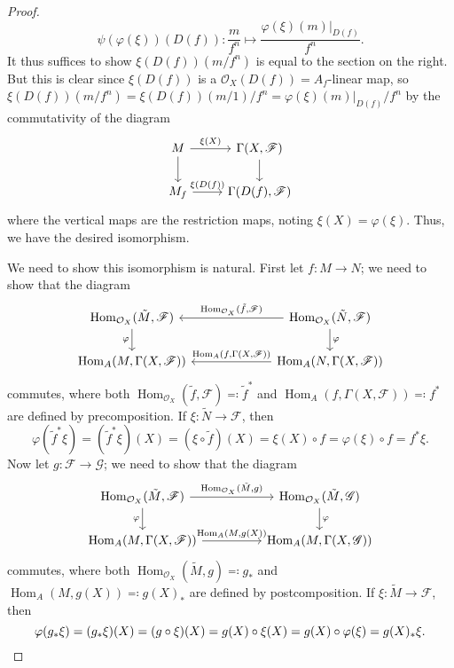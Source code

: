 \documentclass[12pt,letterpaper]{article}
\theoremstyle{definition}
\theoremstyle{remark}
\numberwithin{equation}{section}
\numberwithin{figure}{problem}
\DeclareMathOperator{\Hom}{Hom}
\newcommand{\FF}{\mathscr{F}}
\newcommand{\GG}{\mathscr{G}}
\newcommand{\OO}{\mathcal{O}}
\begin{document}
\begin{proof}
  \begin{equation*}
    \psi(\varphi(\xi))(D(f)) \colon \frac{m}{f^n} \mapsto \frac{\varphi(\xi)(m)\vert_{D(f)}}{f^n}.
  \end{equation*}
  It thus suffices to show $\xi(D(f))(m/f^n)$ is equal to the section on the right. But this is clear since $\xi(D(f))$ is a $\OO_X(D(f)) = A_f$-linear map, so $\xi(D(f))(m/f^n) = \xi(D(f))(m/1)/f^n = \varphi(\xi)(m)\vert_{D(f)}/f^n$ by the commutativity of the diagram
  \begin{equation*}
    \begin{tikzcd}
      M \rar{\xi(X)}\dar & \Gamma(X,\FF)\dar\\
      M_f \rar{\xi(D(f))} & \Gamma(D(f),\FF)
    \end{tikzcd}
  \end{equation*}
  where the vertical maps are the restriction maps, noting $\xi(X) = \varphi(\xi)$. Thus, we have the desired isomorphism.
  \par We need to show this isomorphism is natural. First let $f \colon M \to N$; we need to show that the diagram
  \begin{equation*}
    \begin{tikzcd}[column sep=15ex]
      \Hom_{\OO_X}(\tilde{M},\FF) \dar[swap]{\varphi} & \arrow{l}[swap]{\Hom_{\OO_X}(\tilde{f},\FF)} \Hom_{\OO_X}(\tilde{N},\FF) \dar{\varphi}\\
      \Hom_A(M,\Gamma(X,\FF)) & \arrow{l}[swap]{\Hom_A(f,\Gamma(X,\FF))} \Hom_A(N,\Gamma(X,\FF))
    \end{tikzcd}
  \end{equation*}
  commutes, where both $\Hom_{\OO_X}(\tilde{f},\FF) \eqqcolon \tilde{f}^*$ and $\Hom_A(f,\Gamma(X,\FF)) \eqqcolon f^*$ are defined by precomposition. If $\xi\colon \tilde{N} \to \FF$, then
  \begin{equation*}
    \varphi(\tilde{f}^*\xi) = (\tilde{f}^*\xi)(X) = (\xi\circ\tilde{f})(X) = \xi(X) \circ f = \varphi(\xi) \circ f = f^*\xi.
  \end{equation*}
  Now let $g\colon \FF \to \GG$; we need to show that the diagram
  \begin{equation*}
    \begin{tikzcd}[column sep=huge]
      \Hom_{\OO_X}(\tilde{M},\FF) \rar{\Hom_{\OO_X}(\tilde{M},g)}\dar[swap]{\varphi} & \Hom_{\OO_X}(\tilde{M},\GG)\dar{\varphi}\\
      \Hom_A(M,\Gamma(X,\FF)) \rar{\Hom_A(M,g(X))} & \Hom_A(M,\Gamma(X,\GG))
    \end{tikzcd}
  \end{equation*}
  commutes, where both $\Hom_{\OO_X}(\tilde{M},g) \eqqcolon g_*$ and $\Hom_A(M,g(X)) \eqqcolon g(X)_*$ are defined by postcomposition. If $\xi\colon \tilde{M} \to \FF$, then
  \begin{equation*}
    \varphi(g_*\xi) = (g_*\xi)(X) = (g \circ \xi)(X) = g(X) \circ \xi(X) = g(X) \circ \varphi(\xi) = g(X)_*\xi.\qedhere
  \end{equation*}
\end{proof}
\end{document}
